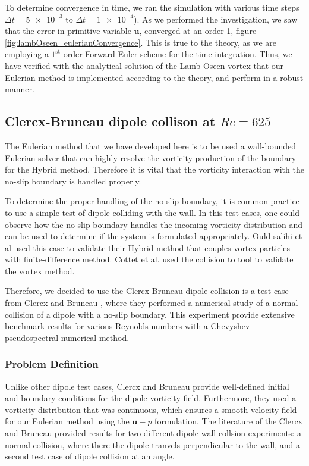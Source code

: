 To determine convergence in time, we ran the simulation with various time steps $\Delta t = \num{5e-3}$ to $\Delta t = \num{1e-4}$). As we performed the investigation, we saw that the error in primitive variable $\mathbf{u}$, converged at an order 1, figure \ref{fig:lambOseen_eulerianConvergence}. This is true to the theory, as we are employing a $1^{\mathrm{st}}$-order Forward Euler scheme for the time integration. Thus, we have verified with the analytical solution of the Lamb-Oseen vortex that our Eulerian method is implemented according to the theory, and perform in a robust manner.
	

\subsection{Clercx-Bruneau dipole collison at $Re=625$}

The Eulerian method that we have developed here is to be used a wall-bounded Eulerian solver that can highly resolve the vorticity production of the boundary for the Hybrid method. Therefore it is vital that the vorticity interaction with the no-slip boundary is handled properly.

To determine the proper handling of the no-slip boundary, it is common practice to use a simple test of dipole colliding with the wall. In this test cases, one could observe how the no-slip boundary handles the incoming vorticity distribution and can be used to determine if the system is formulated appropriately.  Ould-salihi et al \cite{} used this case to validate their Hybrid method that couples vortex particles with finite-difference method. Cottet et al. \cite{} used the collision to tool to validate the vortex method. 

Therefore, we decided to use the Clercx-Bruneau dipole collision is a test case from Clercx and Bruneau \cite{}, where they performed a numerical study of a normal collision of a dipole with a no-slip boundary. This experiment provide extensive benchmark results for various Reynolds numbers with a Chevyshev pseudospectral numerical method. 

\subsubsection*{Problem Definition}

Unlike other dipole test cases, Clercx and Bruneau provide well-defined initial and boundary conditions for the dipole vorticity field. Furthermore, they used a vorticity distribution that was continuous, which ensures a smooth velocity field for our Eulerian method using the $\mathbf{u}-p$ formulation. The literature of the Clercx and Bruneau provided results for two different dipole-wall collsion experiments: a normal collision, where there the dipole tranvels perpendicular to the wall, and a second test case of dipole collision at an angle. 

